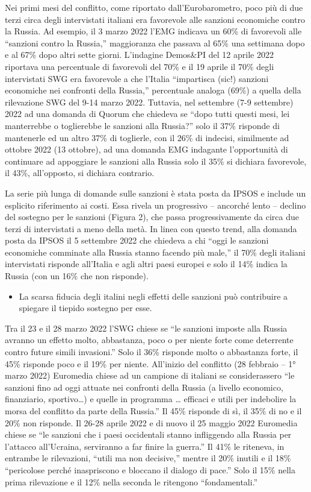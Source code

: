\documentclass[
]{book}
\providecommand{\tightlist}{%
  \setlength{\itemsep}{0pt}\setlength{\parskip}{0pt}}
\begin{document}
Nei primi mesi del conflitto, come riportato dall'Eurobarometro, poco più di due terzi circa degli intervistati italiani era favorevole alle sanzioni economiche contro la Russia. Ad esempio, il 3 marzo 2022 l'EMG indicava un 60\% di favorevoli alle ``sanzioni contro la Russia,'' maggioranza che passava al 65\% una settimana dopo e al 67\% dopo altri sette giorni. L'indagine Demos\&PI del 12 aprile 2022 riportava una percentuale di favorevoli del 70\% e il 19 aprile il 70\% degli intervistati SWG era favorevole a che l'Italia ``impartisca (sic!) sanzioni economiche nei confronti della Russia,'' percentuale analoga (69\%) a quella della rilevazione SWG del 9-14 marzo 2022. Tuttavia, nel settembre (7-9 settembre) 2022 ad una domanda di Quorum che chiedeva se ``dopo tutti questi mesi, lei manterrebbe o toglierebbe le sanzioni alla Russia?'' solo il 37\% risponde di mantenerle ed un altro 37\% di toglierle, con il 26\% di indecisi, similmente ad ottobre 2022 (13 ottobre), ad una domanda EMG indagante l'opportunità di continuare ad appoggiare le sanzioni alla Russia solo il 35\% si dichiara favorevole, il 43\%, all'opposto, si dichiara contrario.

La serie più lunga di domande sulle sanzioni è stata posta da IPSOS e include un esplicito riferimento ai costi. Essa rivela un progressivo -- ancorché lento -- declino del sostegno per le sanzioni (Figura 2), che passa progressivamente da circa due terzi di intervistati a meno della metà. In linea con questo trend, alla domanda posta da IPSOS il 5 settembre 2022 che chiedeva a chi ``oggi le sanzioni economiche comminate alla Russia stanno facendo più male,'' il 70\% degli italiani intervistati risponde all'Italia e agli altri paesi europei e solo il 14\% indica la Russia (con un 16\% che non risponde).

\begin{itemize}
\tightlist
\item
  La scarsa fiducia degli italini negli effetti delle sanzioni può contribuire a spiegare il tiepido sostegno per esse.
\end{itemize}

Tra il 23 e il 28 marzo 2022 l'SWG chiese se ``le sanzioni imposte alla Russia avranno un effetto molto, abbastanza, poco o per niente forte come deterrente contro future simili invasioni.'' Solo il 36\% risponde molto o abbastanza forte, il 45\% risponde poco e il 19\% per niente. All'inizio del conflitto (28 febbraio -- 1° marzo 2022) Euromedia chiese ad un campione di italiani se considerassero ``le sanzioni fino ad oggi attuate nei confronti della Russia (a livello economico, finanziario, sportivo\ldots) e quelle in programma \ldots{} efficaci e utili per indebolire la morsa del conflitto da parte della Russia.'' Il 45\% risponde di sì, il 35\% di no e il 20\% non risponde. Il 26-28 aprile 2022 e di nuovo il 25 maggio 2022 Euromedia chiese se ``le sanzioni che i paesi occidentali stanno infliggendo alla Russia per l'attacco all'Ucraina, serviranno a far finire la guerra.'' Il 41\% le riteneva, in entrambe le rilevazioni, ``utili ma non decisive,'' mentre il 20\% inutili e il 18\% ``pericolose perché inaspriscono e bloccano il dialogo di pace.'' Solo il 15\% nella prima rilevazione e il 12\% nella seconda le ritengono ``fondamentali.''
\end{document}

